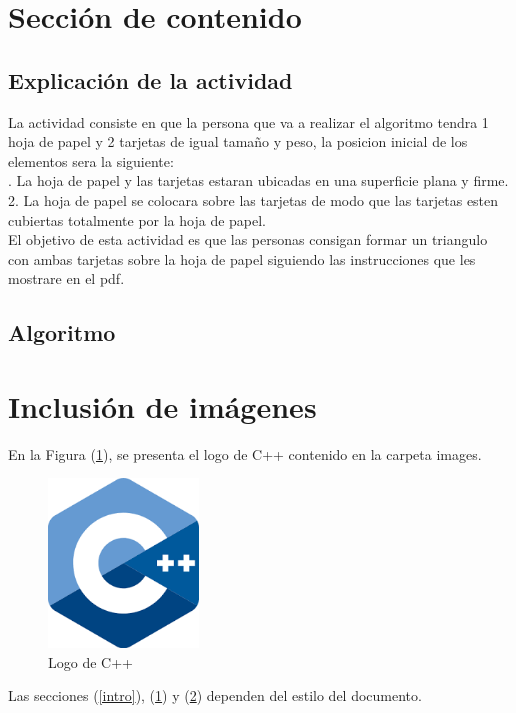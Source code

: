 \documentclass{article}
\begin{document}
\section{Sección de contenido} \label{contenido}

\subsection{Explicación de la actividad}
La actividad consiste en que la persona que va a realizar el algoritmo tendra 1 hoja de papel y 2 tarjetas de igual tamaño y peso, la posicion inicial de los elementos sera la siguiente:\\
. La hoja de papel y las tarjetas estaran ubicadas en una superficie plana y firme.\\
2. La hoja de papel se colocara sobre las tarjetas de modo que las tarjetas esten cubiertas totalmente por la hoja de papel.\\
\newline
El objetivo de esta actividad es que las personas consigan formar un triangulo con ambas tarjetas sobre la hoja de papel siguiendo las instrucciones que les mostrare en el pdf.

\subsection{Algoritmo}


\section{Inclusión de imágenes} \label{imagenes}

En la Figura (\ref{fig:cpplogo}), se presenta el logo de C++ contenido en la carpeta images.

\begin{figure}[h]
\includegraphics[width=4cm]{cpplogo.png}
\centering
\caption{Logo de C++}
\label{fig:cpplogo}
\end{figure}

Las secciones (\ref{intro}), (\ref{contenido}) y (\ref{imagenes}) dependen del estilo del documento.



\end{document}
